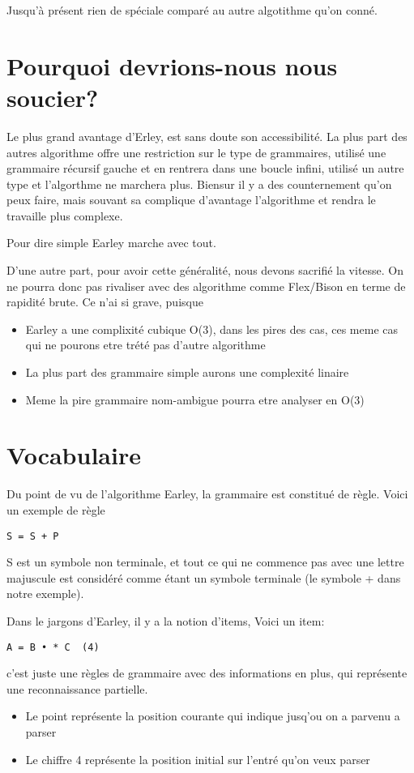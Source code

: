 \documentclass[10pt]{report}
\begin{document}
Jusqu'à présent rien de spéciale comparé au autre algotithme qu'on conné. 
\section{Pourquoi devrions-nous nous soucier?}
Le plus grand avantage d'Erley, est sans doute son accessibilité. La plus part des autres algorithme offre une restriction sur le type de grammaires, utilisé une grammaire récursif gauche et en rentrera dans une boucle infini, utilisé un autre type et l'algorthme ne marchera plus. Biensur il y a des counternement qu'on peux faire, mais souvant sa complique d'avantage l'algorithme et rendra le travaille plus complexe.

Pour dire simple Earley marche avec tout.

D'une autre part, pour avoir cette généralité, nous devons sacrifié la vitesse. On ne pourra donc pas rivaliser avec des algorithme comme Flex/Bison en terme de rapidité brute. Ce n'ai si grave, puisque
\begin{itemize}
	\item Earley a une complixité cubique O(3), dans les pires des cas, ces meme cas qui ne pourons etre trété pas d'autre algorithme
	\item La plus part des grammaire simple aurons une complexité linaire
	\item Meme la pire grammaire nom-ambigue pourra etre analyser en O(3)
\end{itemize}
\section{Vocabulaire}
Du point de vu de l'algorithme Earley, la grammaire est constitué de règle. Voici un exemple de règle
\begin{lstlisting}
S = S + P
\end{lstlisting}
S est un symbole non terminale, et tout ce qui ne commence pas avec une lettre majuscule est considéré comme étant un symbole terminale (le symbole + dans notre exemple).

Dans le jargons d'Earley, il y a la notion d'items, Voici un item:
\begin{lstlisting}
A = B • * C  (4)
\end{lstlisting}
c'est juste une règles de grammaire avec des informations en plus, qui représente une reconnaissance partielle.
\begin{itemize}
	\item Le point représente la position courante qui indique jusq'ou on a parvenu a parser
	\item Le chiffre 4 représente la position initial sur l'entré qu'on veux parser
\end{itemize}
\end{document}
